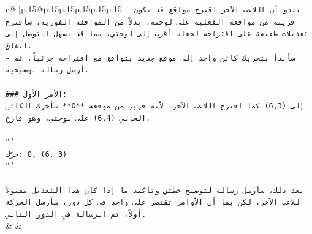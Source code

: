 \documentclass{article}
\begin{document}
{\begin{supertabular}{c@{$\;$}|p{.15\linewidth}@{}p{.15\linewidth}p{.15\linewidth}p{.15\linewidth}p{.15\linewidth}p{.15\linewidth}}
{{{\texttt{{-} يبدو أن اللاعب الآخر اقترح مواقع قد تكون قريبة من مواقعه الفعلية على لوحته. بدلاً من الموافقة الفورية، سأقترح تعديلات طفيفة على اقتراحه لجعله أقرب إلى لوحتي، مما قد يسهل التوصل إلى اتفاق.} \\
\texttt{{-} سأبدأ بتحريك كائن واحد إلى موقع جديد يتوافق مع اقتراحه جزئياً، ثم أرسل رسالة توضيحية.} \\
\\ 
\texttt{\#\#\# الأمر الأول:} \\
\texttt{سأحرك الكائن **O** إلى (6,3) كما اقترح اللاعب الآخر، لأنه قريب من موقعه الحالي (6,4) على لوحتي، وهو فارغ.} \\
\\ 
\texttt{```} \\
\texttt{حرّك: O, (6, 3)} \\
\texttt{```} \\
\\ 
\texttt{بعد ذلك، سأرسل رسالة لتوضيح خطتي وتأكيد ما إذا كان هذا التعديل مقبولاً للاعب الآخر. لكن بما أن الأوامر تقتصر على واحد في كل دور، سأرسل الحركة أولاً، ثم الرسالة في الدور التالي.} \\
            }
        }
    }
    & & \\ \\


\end{supertabular}}
\end{document}

